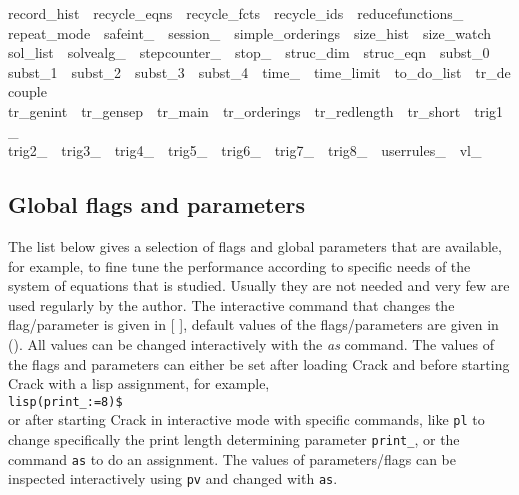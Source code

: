 \documentclass[12pt]{article}
\begin{document}
{record\_hist\ \ recycle\_eqns\ \ recycle\_fcts\ \ recycle\_ids\ \ reducefunctions\_\ \ \\
repeat\_mode\ \ safeint\_\ \ session\_\ \ simple\_orderings\ \ size\_hist\ \ size\_watch\ \ \\
sol\_list\ \ solvealg\_\ \ stepcounter\_\ \ stop\_\ \ struc\_dim\ \ struc\_eqn\ \ subst\_0\ \ \\
subst\_1\ \ subst\_2\ \ subst\_3\ \ subst\_4\ \ time\_\ \ time\_limit\ \ to\_do\_list\ \ tr\_decouple\ \ \\
tr\_genint\ \ tr\_gensep\ \ tr\_main\ \ tr\_orderings\ \ tr\_redlength\ \ tr\_short\ \ trig1\_\ \ \\
trig2\_\ \ trig3\_\ \ trig4\_\ \ trig5\_\ \ trig6\_\ \ trig7\_\ \ trig8\_\ \ userrules\_\ \ vl\_}

\subsection{Global flags and parameters}
The list below gives a selection of
flags and global parameters that are available, for example,
to fine tune the performance according to specific needs of the system
of equations that is studied. Usually they are not needed and very few
are used regularly by the author. The interactive command that changes the
flag/parameter is given in [ ], default values of the flags/parameters
are given in (). All values can be changed interactively with the {\em as} command.
The values of the flags and parameters can either be
set after loading {\sc Crack} and before starting {\sc Crack} with a
lisp assignment, for example,\\
\verb+lisp(print_:=8)$+ \\ %
or after starting {\sc Crack} in interactive mode with specific commands,
like {\tt pl} to change specifically the print length determining parameter
{\tt print\_}, or the command {\tt as} to do an assignment.
The values of
parameters/flags can be inspected interactively using {\tt pv}
and changed with {\tt as}.
\end{document}
